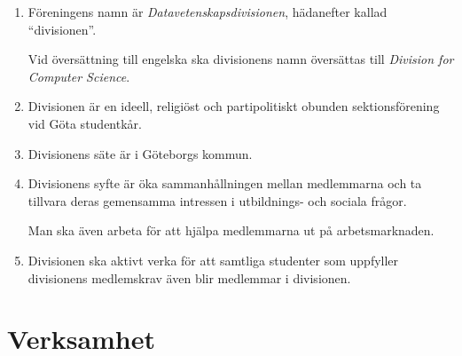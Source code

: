 \documentclass{dvd}
\begin{document}
	\begin{enumerate}[label=\arabic* §, ref=\arabic*]

		\item Föreningens namn är \emph{Datavetenskapsdivisionen}, hädanefter kallad ``divisionen''.

		Vid översättning till engelska ska divisionens namn översättas till \emph{Division for Computer Science}.

		\item Divisionen är en ideell, religiöst och partipolitiskt obunden sektionsförening vid Göta studentkår.

		\item Divisionens säte är i Göteborgs kommun.

		\item Divisionens syfte är öka sammanhållningen mellan medlemmarna och ta tillvara deras gemensamma intressen i utbildnings- och sociala frågor.

		Man ska även arbeta för att hjälpa medlemmarna ut på arbetsmarknaden.

		\item Divisionen ska aktivt verka för att samtliga studenter som uppfyller divisionens medlemskrav även blir medlemmar i divisionen.
	\end{enumerate}

	\section{Verksamhet}
\end{document}
